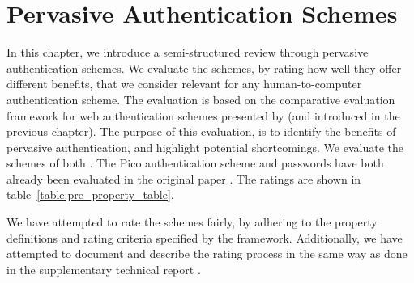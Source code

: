 \chapter{Pervasive Authentication Schemes}\label{ch:review}


In this chapter, we introduce a semi-structured review through pervasive authentication schemes. We evaluate the schemes, by rating how well they offer different benefits, that we consider relevant for any human-to-computer authentication scheme. The evaluation is based on the comparative evaluation framework for web authentication sch\-emes presented by \citet{bonneau2012quest} (and introduced in the previous chapter). The purpose of this evaluation, is to identify the benefits of pervasive authentication, and highlight potential shortcomings. We evaluate the schemes of both \citet{bardram2003context, ojala2008wearable}. The Pico authentication scheme \cite{stajano2011pico} and passwords have both already been evaluated in the original paper \cite{bonneau2012quest}. The ratings are shown in table~\ref{table:pre_property_table}. 

We have attempted to rate the schemes fairly, by adhering to the property definitions and rating criteria specified by the framework. Additionally, we have attempted to document and describe the rating process in the same way as done in the supplementary technical report \cite{UCAM-CL-TR-817}.

